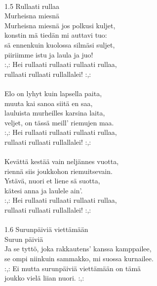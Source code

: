 \hspace{10mm} \\
1.5 Rullaati rullaa \\
Murheisna miesnä \\
            Murheisna miesnä jos polkusi kuljet, \\
            konstin mä tiedän mi auttavi tuo: \\
            sä ennenkuin kuolossa silmäsi suljet, \\
            piiriimme istu ja laula ja juo! \\
            :,: Hei rullaati rullaati rullaati rullaa, \\
            rullaati rullaati rullallalei! :,: \\
\hspace{10mm} \\
            Elo on lyhyt kuin lapsella paita, \\
            muuta kai sanoa siitä en saa, \\
            lauluista murheilles karsina laita, \\
            veljet, on tässä meill' riemujen maa. \\
            :,: Hei rullaati rullaati rullaati rullaa, \\
            rullaati rullaati rullallalei! :,: \\
\hspace{10mm} \\
            Kevättä kestää vain neljännes vuotta, \\
            riennä siis joukkohon riemuitsevain. \\
            Ystävä, nuori et liene sä suotta, \\
            kätesi anna ja laulele ain'. \\
            :,: Hei rullaati rullaati rullaati rullaa, \\
            rullaati rullaati rullallalei! :,: \\
\hspace{10mm} \\
1.6 Surunpäiviä viettämään \\
Surun päiviä \\
            Ja se tyttö, joka rakkautens' kanssa kamppailee, \\
            se ompi niinkuin sammakko, mi suossa kurnailee. \\
            :,: Ei mutta surunpäiviä viettämään on tämä \\
            joukko vielä liian nuori. :,: \\
